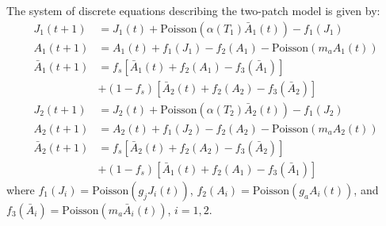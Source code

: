 \documentclass[12pt, table]{article}
\begin{document}
The system of discrete equations describing the   two-patch model is given by: 
 \begin{align}
 J_1(t+1)&=  J_1(t)+\text{Poisson$\left(\alpha(T_1)\bar{A}_1(t)\right)$}-f_1(J_1)\nonumber\\  
 A_1(t+1)&=  A_1(t)+f_1(J_1)-f_2(A_1)-\text{Poisson$\left(m_aA_1(t)\right)$}\\  
 \bar{A}_1(t+1)&=  f_s\left[\bar{A}_1(t)+f_2(A_1)-f_3(\bar{A}_1)\right]\nonumber\\&+(1-f_s)\left[\bar{A}_2(t)+f_2(A_2)-f_3(\bar{A}_2)\right]\nonumber\\
 J_2(t+1)&=  J_2(t)+\text{Poisson$\left(\alpha(T_2)\bar{A}_2(t)\right)$}-f_1(J_2)\nonumber\\  
 A_2(t+1)&=  A_2(t)+f_1(J_2)-f_2(A_2)-\text{Poisson$\left(m_aA_2(t)\right)$}\nonumber\\  
 \bar{A}_2(t+1)&=  f_s\left[\bar{A}_2(t)+f_2(A_2)-f_3(\bar{A}_2)\right]\nonumber\\&+(1-f_s)\left[\bar{A}_1(t)+f_2(A_1)-f_3(\bar{A}_1)\right]\nonumber
\end{align}
where $f_1(J_i)=\text{Poisson$\left(g_jJ_i(t)\right)$}$,  $f_2(A_i)=\text{Poisson$\left(g_aA_i(t)\right)$}$,  and $f_3(\bar{A}_i)= \text{Poisson$\left(m_a\bar{A}_i(t)\right)$}$, $i=1,2.$
\end{document}
